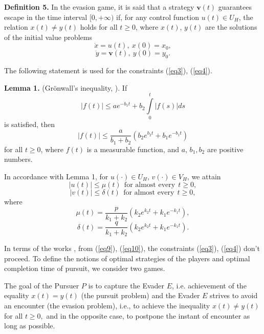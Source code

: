 \documentclass[10 pt]{book}
\begin{document}
\textbf{Definition 5.}
In the evasion game, it is said that a strategy $\mathbf{v}(t)$ guarantees escape in the time interval $[0,+\infty)$ if, for any control
 function $u(t)\in U_{H}$, the relation $x(t) \neq y(t)$ holds
 for all $t\geq0$, where $x(t)$, $y(t)$ are the solutions of the initial value problems
\begin{equation}\label{eq7}
\dot{x}= u(t), \  x(0)=x_0,
\end{equation}
\begin{equation}\label{eq8}
\dot{y}=\mathbf{v}(t), \  y(0)=y_0.
\end{equation}

The following statement is used for the constraints (\ref{eq3}), (\ref{eq4}).

\textbf{Lemma 1.}
(Gr\"{o}nwall's inequality, \cite{25}). If $$|f(t)| \le a e^{-b_{1} t} +b_{2}
\int\limits_{0}^{t} |f(s)|ds$$ is satisfied, then $$|f(t)| \le
\frac{a}{b_{1}+b_{2}}(b_{2}e^{b_{2}t}+b_{1}e^{-b_{1}t})$$ for all $t \geq 0$, where $f(t)$ is a measurable
function, and  $a$, $b_{1}, b_{2}$ are positive numbers.

In accordance with Lemma 1, for $u(\cdot)\in U_{H}$, $v(\cdot)\in
V_{H}$, we attain
\begin{equation}\label{eq9}
|u(t)| \leq \mu(t) \ \ \mbox{for almost every} \ \ t\geq0,
\end{equation}
\begin{equation}\label{eq10}
|v(t)| \leq \delta(t) \ \ \mbox{for almost every} \ \ t\ge 0,
\end{equation}
where
\begin{equation}\label{eq11}
\mu(t)=\frac{p}{k_{1}+k_{2}}(k_{2}e^{k_{2}t}+k_{1}e^{-k_{1}t}),
\end{equation}
\begin{equation}\label{eq12}
\delta(t)=\frac{q}{k_{1}+k_{2}}(k_{2}e^{k_{2}t}+k_{1}e^{-k_{1}t}).
\end{equation}

In terms of the works \cite{24,25}, from (\ref{eq9}), (\ref{eq10}), the constraints (\ref{eq3}),
(\ref{eq4}) don't proceed. To define the notions of optimal strategies of
the players and optimal completion time of pursuit, we consider two games.

The goal of the Pursuer $P$ is to capture the Evader $E$, i.e.
achievement of the equality $x(t)=y(t)$ (the pursuit problem) and the
Evader $E$ strives to avoid an encounter (the evasion problem), i.e., to achieve the
inequality $x(t)\neq y(t)$ for all $t\geq 0,$ and in the opposite
case, to postpone the instant of encounter as long as
possible.
\end{document}
